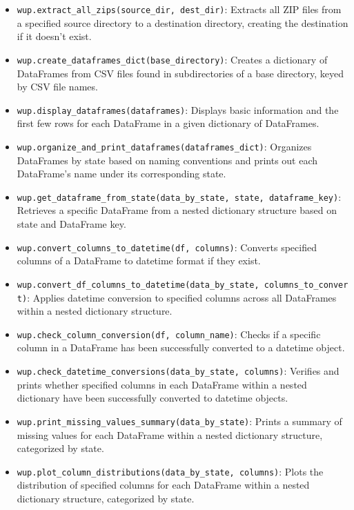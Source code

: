 \documentclass[mstat,12pt]{unswthesis}
\begin{document}
\begin{itemize}
\item
  \texttt{wup.extract\_all\_zips(source\_dir,\ dest\_dir)}: Extracts all
  ZIP files from a specified source directory to a destination
  directory, creating the destination if it doesn't exist.
\item
  \texttt{wup.create\_dataframes\_dict(base\_directory)}: Creates a
  dictionary of DataFrames from CSV files found in subdirectories of a
  base directory, keyed by CSV file names.
\item
  \texttt{wup.display\_dataframes(dataframes)}: Displays basic
  information and the first few rows for each DataFrame in a given
  dictionary of DataFrames.
\item
  \texttt{wup.organize\_and\_print\_dataframes(dataframes\_dict)}:
  Organizes DataFrames by state based on naming conventions and prints
  out each DataFrame's name under its corresponding state.
\item
  \texttt{wup.get\_dataframe\_from\_state(data\_by\_state,\ state,\ dataframe\_key)}:
  Retrieves a specific DataFrame from a nested dictionary structure
  based on state and DataFrame key.
\item
  \texttt{wup.convert\_columns\_to\_datetime(df,\ columns)}: Converts
  specified columns of a DataFrame to datetime format if they exist.
\item
  \texttt{wup.convert\_df\_columns\_to\_datetime(data\_by\_state,\ columns\_to\_convert)}:
  Applies datetime conversion to specified columns across all DataFrames
  within a nested dictionary structure.
\item
  \texttt{wup.check\_column\_conversion(df,\ column\_name)}: Checks if a
  specific column in a DataFrame has been successfully converted to a
  datetime object.
\item
  \texttt{wup.check\_datetime\_conversions(data\_by\_state,\ columns)}:
  Verifies and prints whether specified columns in each DataFrame within
  a nested dictionary have been successfully converted to datetime
  objects.
\item
  \texttt{wup.print\_missing\_values\_summary(data\_by\_state)}: Prints
  a summary of missing values for each DataFrame within a nested
  dictionary structure, categorized by state.
\item
  \texttt{wup.plot\_column\_distributions(data\_by\_state,\ columns)}:
  Plots the distribution of specified columns for each DataFrame within
  a nested dictionary structure, categorized by state.
\end{itemize}
\end{document}
